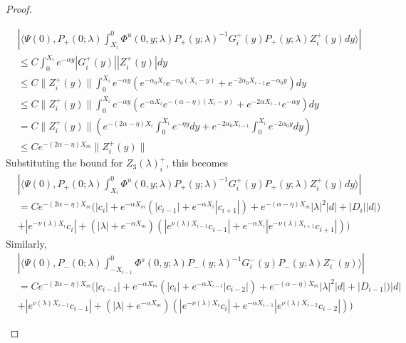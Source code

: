 \documentclass[thesis.tex]{subfiles}
\begin{document}
\begin{lemma}
\begin{proof}
\begin{enumerate}
\begin{align*}
&\left| \langle \Psi(0), P_+(0; \lambda) \int_{X_i}^0 \Phi^u(0, y; \lambda) P_+(y; \lambda)^{-1} G_i^+(y) P_+(y; \lambda) Z_i^+(y) dy \rangle \right| \\
&\leq C \int_0^{X_i} e^{-\alpha y} |G_i^+(y)| |Z_i^+(y)| dy \\
&\leq C \|Z_i^+(y)\| \int_0^{X_i} e^{-\alpha y} \left( e^{-\alpha_0 X_i} e^{-\alpha_0(X_i - y) } + e^{-2 \alpha_0 X_{i-1}} e^{-\alpha_0 y} \right) dy \\
&\leq C \|Z_i^+(y)\| \int_0^{X_i} e^{-\alpha y} \left( e^{-\alpha X_i} e^{-(\alpha - \eta)(X_i - y) } + e^{-2\alpha X_{i-1}} e^{-\alpha y} \right) dy \\
&= C \|Z_i^+(y)\| \left( e^{-(2 \alpha - \eta)X_i } \int_0^{X_i} e^{-\eta y} dy + e^{-2\alpha_0 X_{i-1}} \int_0^{X_i} e^{-2 \alpha_0 y} dy \right) \\
&\leq C e^{-(2 \alpha - \eta)X_m } \|Z_i^+(y)\|
\end{align*}
Substituting the bound for $Z_3(\lambda)_i^+$, this becomes
\begin{align*}
&\left| \langle \Psi(0), P_+(0; \lambda) \int_{X_i}^0 \Phi^u(0, y; \lambda) P_+(y; \lambda)^{-1} G_i^+(y) P_+(y; \lambda) Z_i^+(y) dy \rangle \right| \\
&= C e^{-(2 \alpha - \eta)X_m } \Big(|c_i| + e^{-\alpha X_m}(|c_{i-1}| + e^{-\alpha X_i} |c_{i+1}|) + e^{-(\alpha - \eta) X_m}|\lambda|^2|d| + |D_i||d|) \\
&+ |e^{-\nu(\lambda)X_i} c_i| + (|\lambda| + e^{-\alpha X_m})(|e^{\nu(\lambda)X_{i-1}} c_{i-1}| + e^{-\alpha X_i} |e^{-\nu(\lambda)X_{i+1}} c_{i+1}|)\Big)
\end{align*}
Similarly,
\begin{align*}
&\left| \langle \Psi(0), P_-(0; \lambda) \int_{-X_{i-1}}^0 \Phi^s(0, y; \lambda) P_-(y; \lambda)^{-1} G_i^-(y) P_-(y; \lambda)Z_i^-(y) \rangle \right| \\
&= C e^{-(2 \alpha - \eta)X_m } \Big(|c_{i-1}| + e^{-\alpha X_m}(|c_i| + e^{-\alpha X_{i-1}} |c_{i-2}|) + e^{-(\alpha - \eta) X_m}|\lambda|^2|d| + |D_{i-1}|)|d| \\
&+ |e^{\nu(\lambda)X_{i-1}}c_{i-1}| + (|\lambda| + e^{-\alpha X_m})(|e^{-\nu(\lambda)X_i} c_i| + e^{-\alpha X_{i-1}} |e^{\nu(\lambda)X_{i-2}} c_{i-2}|)\Big) 
\end{align*}

\end{enumerate}


\end{proof}
\end{lemma}
\end{document}
